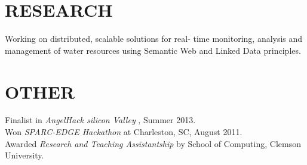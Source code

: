 \documentclass[line,margin]{res}
\begin{document}
\begin{resume}
\section{RESEARCH}  Working on distributed, scalable solutions for real- time monitoring, analysis and management of water resources using Semantic Web and Linked Data principles.

\section{OTHER}             
            Finalist in {\it AngelHack silicon Valley} , Summer 2013. \\
            Won {\it SPARC-EDGE Hackathon} at Charleston, SC, August 2011. \\
            Awarded {\it Research and Teaching Assistantship} by School of Computing, Clemson University.\\ 
\end{resume}
\end{document}

